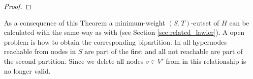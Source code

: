 \begin{proof}
%
%

\end{proof}

As a consequence of this Theorem a minimum-weight $(S,T)$-cutset of $H$ can be calculated with
 the same way as with  (see Section \ref{sec:related_lawler}). A open
problem is how to obtain the corresponding bipartition. In  all hypernodes
reachable from nodes in $S$ are part of the first and all not reachable are part of the
second partition. Since we delete all nodes $v \in V'$ from  in  this
relationship is no longer valid. 

